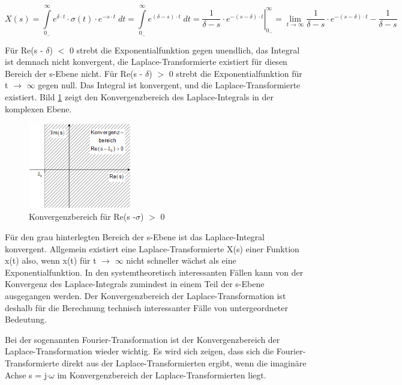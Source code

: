\begin{equation}\label{eq:fourtwentyfive}
X\left(s\right)=\int\limits _{0_{-} }^{\infty }e^{\delta \cdot t} \cdot \sigma \left(t\right)\cdot e^{-s\cdot t} \; dt= \int\limits _{0_{-} }^{\infty }e^{\left(\delta -s\right)\cdot t} \; dt= \left. \frac{1}{\delta -s} \cdot e^{-\left(s-\delta \right)\cdot t} \right|_{0_{-} }^{\infty } =\lim \limits_{t\to \infty } \frac{1}{\delta -s} \cdot e^{-\left(s-\delta \right)\cdot t} -\frac{1}{\delta -s}
\end{equation}

\noindent Für Re(s - $\delta$) $\mathrm{<}$ 0 strebt die Exponentialfunktion gegen unendlich, das Integral ist demnach nicht konvergent, die Laplace-Transformierte existiert f\"{u}r diesen Bereich der s-Ebene nicht. F\"{u}r Re(s - $\delta$) $\mathrm{>}$ 0 strebt die Exponentialfunktion für t $\rightarrow$ $\infty$ gegen null. Das Integral ist konvergent, und die Laplace-Transformierte existiert. Bild \ref{fig:KonvergenzBereich} zeigt den Konvergenzbereich des Laplace-Integrals in der komplexen Ebene.

\begin{figure}[H]
  \centerline{\includegraphics[width=0.4\textwidth]{Kapitel3/Bilder/image6}}
  \caption{Konvergenzbereich für Re(s -$\sigma$) $\mathrm{>}$ 0}
  \label{fig:KonvergenzBereich}
\end{figure}

\noindent Für den grau hinterlegten Bereich der s-Ebene ist das Laplace-Integral konvergent. Allgemein existiert eine Laplace-Transformierte X(s) einer Funktion x(t) also, wenn {\textbar}x(t){\textbar} für t $\rightarrow$ $\infty$ nicht schneller wächst als eine Exponentialfunktion. In den systemtheoretisch interessanten Fällen kann von der Konvergenz des Laplace-Integrals zumindest in einem Teil der s-Ebene ausgegangen werden. Der Konvergenzbereich der Laplace-Transformation ist deshalb für die Berechnung technisch interessanter Fälle von untergeordneter Bedeutung.\medskip

\noindent Bei der sogenannten Fourier-Transformation ist der Konvergenzbereich der Laplace-Transformation wieder wichtig. Es wird sich zeigen, dass sich die Fourier-Transformierte direkt aus der Laplace-Transformierten ergibt, wenn die imagin\"{a}re Achse s = j$\cdot\omega$ im Konvergenzbereich der Laplace-Transformierten liegt.

